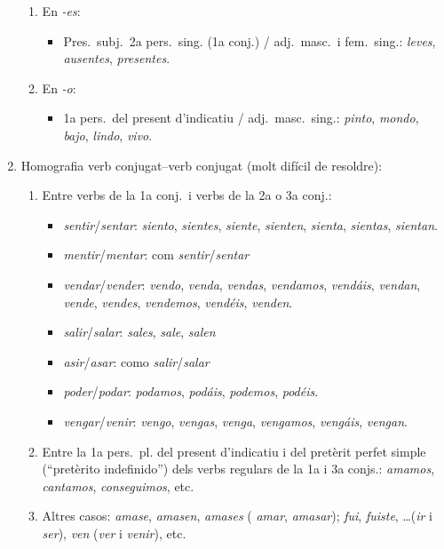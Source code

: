 \begin{enumerate}
\begin{enumerate}
   \item En \emph{-es}: 
   \begin{itemize}
   \item Pres.\ subj.\ 2a pers.\ sing. (1a conj.) / adj.\ masc.\ i fem.\
     sing.: \emph{leves}, \emph{ausentes}, \emph{presentes}.
   \end{itemize}

   \item En \emph{-o}: 
   \begin{itemize}
     \item 1a pers.\ del
      present d'indicatiu / adj.\ masc.\ sing.: \emph{pinto}, \emph{mondo}, \emph{bajo}, \emph{lindo},  \emph{vivo}.
   \end{itemize}  

\end{enumerate}

\item Homografia verb conjugat--verb conjugat (molt difícil de resoldre):
\begin{enumerate}
\item Entre verbs de la 1a conj.\ i verbs de la 2a o 3a conj.:
  \begin{itemize}
  \item \emph{sentir}/\emph{sentar}: \emph{siento}, \emph{sientes}, {\em
      siente}, \emph{sienten}, \emph{sienta}, \emph{sientas}, \emph{ sientan}.
  \item \emph{mentir}/\emph{mentar}: com \emph{sentir}/\emph{sentar}
  \item \emph{vendar}/\emph{vender}: \emph{vendo}, \emph{venda}, {\em
      vendas}, \emph{vendamos}, \emph{vendáis}, \emph{vendan},
    \emph{vende}, \emph{vendes}, \emph{vendemos}, \emph{vendéis}, {\em
      venden}.
  \item \emph{salir}/\emph{salar}: \emph{sales}, \emph{sale}, \emph{salen}
  \item \emph{asir}/\emph{asar}: como \emph{salir}/\emph{salar}
  \item \emph{poder}/\emph{podar}: \emph{podamos}, \emph{podáis}, {\em
      podemos}, \emph{podéis}.
  \item \emph{vengar}/\emph{venir}: \emph{vengo}, \emph{vengas}, {\em
      venga}, \emph{vengamos}, \emph{vengáis}, \emph{vengan}.
  \end{itemize}

\item  Entre la 1a pers.\ pl. del present d'indicatiu i del pretèrit perfet
     simple (``pretèrito indefinido'') dels verbs regulars de la 1a i
     3a conjs.: {\em
       amamos}, \emph{cantamos}, \emph{conseguimos}, etc.
\item Altres casos: \emph{amase},  \emph{amasen}, \emph{amases} ({\em
    amar}, \emph{amasar}); \emph{fui}, \emph{fuiste}, \ldots (\emph{ir} i \emph{ser}),
  \emph{ven} (\emph{ver} i \emph{venir}), etc.
\end{enumerate}



\end{enumerate}
